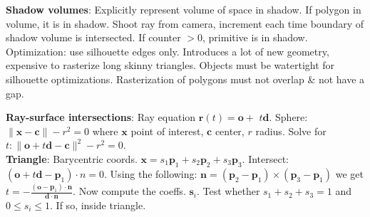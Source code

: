 
\textbf{Shadow volumes}: Explicitly represent volume of space in shadow. If polygon in volume, it is in shadow. Shoot ray from camera, increment each time boundary of shadow volume is intersected. If counter $>0$, primitive is in shadow. Optimization: use silhouette edges only. Introduces a lot of new geometry, expensive to rasterize long skinny triangles. Objects must be watertight for silhouette optimizations. Rasterization of polygons must not overlap \& not have a gap.




\textbf{Ray-surface intersections}: Ray equation $\boldsymbol{r}(t)=\boldsymbol{o}+$ $t \boldsymbol{d}$. Sphere: $\|\boldsymbol{x}-\boldsymbol{c}\|-r^2=0$ where $\boldsymbol{x}$ point of interest, $\boldsymbol{c}$ center, $r$ radius. Solve for $t:\|\boldsymbol{o}+t \boldsymbol{d}-\boldsymbol{c}\|^2-r^2=0$. \\ \textbf{Triangle}: Barycentric coords. $\boldsymbol{x}=s_1 \boldsymbol{p}_1+s_2 \boldsymbol{p}_2+s_3 \boldsymbol{p}_3$. Intersect: $\left(\boldsymbol{o}+t \boldsymbol{d}-\boldsymbol{p}_1\right) \cdot n=0$. Using the following: $\boldsymbol{n}=\left(\boldsymbol{p}_2-\boldsymbol{p}_1\right) \times\left(\boldsymbol{p}_3-\boldsymbol{p}_1\right)$ we get $t=-\frac{\left(\boldsymbol{o}-\boldsymbol{p}_1\right) \cdot \boldsymbol{n}}{\boldsymbol{d} \cdot \boldsymbol{n}}$. Now compute the coeffs. $\boldsymbol{s}_i$. Test whether $s_1+s_2+s_3=1$ and $0 \leq s_i \leq 1$. If so, inside triangle.\\

